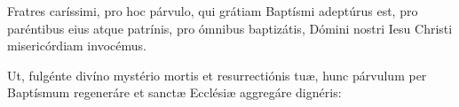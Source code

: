  Fratres caríssimi, pro hoc párvulo, qui grátiam Baptísmi
adeptúrus est, pro paréntibus eius atque patrínis, pro ómnibus baptizátis,
Dómini nostri Iesu Christi mi\-se\-ri\-cór\-di\-am invocémus.

 Ut, fulgénte divíno mystério mortis et resurrectiónis tuæ,
hunc párvulum per Baptísmum regeneráre et sanctæ Ecclésiæ aggregáre
dignéris:

